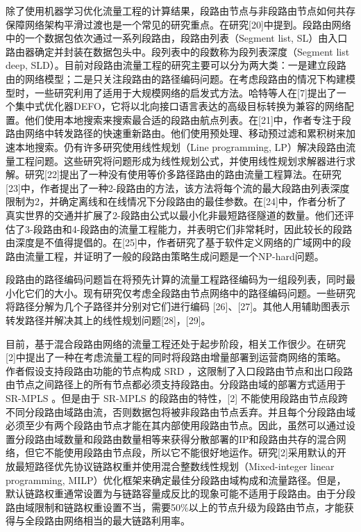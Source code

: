 除了使用机器学习优化流量工程的计算结果，段路由节点与非段路由节点如何共存保障网络架构平滑过渡也是一个常见的研究重点。在研究[20]中提到。段路由网络中的一个数据包依次通过一系列段路由，段路由列表（Segment list, SL）由入口路由器确定并封装在数据包头中。段列表中的段数称为段列表深度（Segment list deep, SLD）。目前对段路由流量工程的研究主要可以分为两大类：一是建立段路由的网络模型；二是只关注段路由的路径编码问题。在考虑段路由的情况下构建模型时，一些研究利用了适用于大规模网络的启发式方法。哈特等人在[7]提出了一个集中式优化器DEFO，它将以北向接口语言表达的高级目标转换为兼容的网络配置。他们使用本地搜索来搜索最合适的段路由航点列表。在[21]中，作者专注于段路由网络中转发路径的快速重新路由。他们使用预处理、移动预过滤和累积树来加速本地搜索。仍有许多研究使用线性规划（Line programming, LP）解决段路由流量工程问题。这些研究将问题形成为线性规划公式，并使用线性规划求解器进行求解。研究[22]提出了一种没有使用等价多路径路由的路由流量工程算法。在研究[23]中，作者提出了一种2-段路由的方法，该方法将每个流的最大段路由列表深度限制为2，并确定离线和在线情况下分段路由的最佳参数。在[24]中，作者分析了真实世界的交通并扩展了2-段路由公式以最小化非最短路径隧道的数量。他们还评估了3-段路由和4-段路由的流量工程能力，并表明它们非常耗时，因此较长的段路由深度是不值得提倡的。在[25]中，作者研究了基于软件定义网络的广域网中的段路由流量工程，并证明了一般的段路由策略生成问题是一个NP-hard问题。

段路由的路径编码问题旨在将预先计算的流量工程路径编码为一组段列表，同时最小化它们的大小。现有研究仅考虑全段路由节点网络中的路径编码问题。一些研究将路径分解为几个子路径并分别对它们进行编码 [26]、[27]。其他人用辅助图表示转发路径并解决其上的线性规划问题[28]，[29]。

目前，基于混合段路由网络的流量工程还处于起步阶段，相关工作很少。在研究[2]中提出了一种在考虑流量工程的同时将段路由增量部署到运营商网络的策略。作者假设支持段路由功能的节点构成 \gls*{SRD} ，这限制了入口段路由节点和出口段路由节点之间路径上的所有节点都必须支持段路由。分段路由域的部署方式适用于 \gls*{SR-MPLS} 。但是由于 \gls*{SR-MPLS} 的段路由的特性，[2] 不能使用段路由节点段跨不同分段路由域路由流，否则数据包将被非段路由节点丢弃。并且每个分段路由域必须至少有两个段路由节点才能在其内部使用段路由节点。因此，虽然可以通过设置分段路由域数量和段路由数量相等来获得分散部署的IP和段路由共存的混合网络，但它不能使用段路由节点段，所以它不能很好地运作。研究[2]采用默认的开放最短路径优先协议链路权重并使用混合整数线性规划（Mixed-integer linear programming, MILP）优化框架来确定最佳分段路由域构成和流量路径。但是，默认链路权重通常设置为与链路容量成反比的现象可能不适用于段路由。由于分段路由域限制和链路权重设置不当，需要50\%以上的节点升级为段路由节点，才能获得与全段路由网络相当的最大链路利用率。

